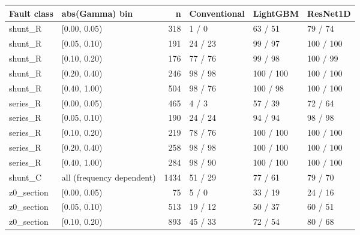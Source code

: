 \begin{tabular}{llrlll}
\toprule
Fault class & abs(Gamma) bin & n & Conventional & LightGBM & ResNet1D \\
\midrule
shunt\_R & [0.00, 0.05) & 318 & 1 / 0 & 63 / 51 & 79 / 74 \\
shunt\_R & [0.05, 0.10) & 191 & 24 / 23 & 99 / 97 & 100 / 100 \\
shunt\_R & [0.10, 0.20) & 176 & 77 / 76 & 99 / 98 & 100 / 99 \\
shunt\_R & [0.20, 0.40) & 246 & 98 / 98 & 100 / 100 & 100 / 100 \\
shunt\_R & [0.40, 1.00) & 504 & 98 / 76 & 100 / 98 & 100 / 100 \\
series\_R & [0.00, 0.05) & 465 & 4 / 3 & 57 / 39 & 72 / 64 \\
series\_R & [0.05, 0.10) & 190 & 24 / 24 & 94 / 94 & 98 / 98 \\
series\_R & [0.10, 0.20) & 219 & 78 / 76 & 100 / 100 & 100 / 100 \\
series\_R & [0.20, 0.40) & 258 & 98 / 98 & 100 / 100 & 100 / 100 \\
series\_R & [0.40, 1.00) & 284 & 98 / 90 & 100 / 100 & 100 / 100 \\
shunt\_C & all (frequency dependent) & 1434 & 51 / 29 & 77 / 61 & 79 / 70 \\
z0\_section & [0.00, 0.05) & 75 & 5 / 0 & 33 / 19 & 24 / 16 \\
z0\_section & [0.05, 0.10) & 513 & 19 / 12 & 50 / 37 & 60 / 51 \\
z0\_section & [0.10, 0.20) & 893 & 45 / 33 & 72 / 54 & 80 / 68 \\
\bottomrule
\end{tabular}
